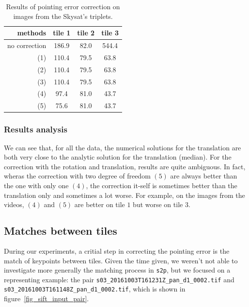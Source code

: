 \documentclass[paper=a4, fontsize=11pt, onecolumn, tikz, dvipsnames, svgnames, x11names]{article}
\begin{document}
        \begin{table}[h]
\centering
             \begin{tabular}{|r||c|c|c|}
              \hline
          methods &    tile 1 & tile 2 & tile 3 \\
              \hline
         no correction &    186.9& 82.0& 544.4 \\
             \hline
      (1) & 110.4& 79.5& 63.8\\
       (2) & 110.4& 79.5& 63.8\\
      (3) &  110.4& 79.5& 63.8\\
      (4) &  97.4& 81.0& 43.7\\
      (5) &  75.6& 81.0& 43.7\\
              \hline
            \end{tabular}
                            \caption{Results of pointing error correction on images from the Skysat's triplets.}
             \label{tab:triplet-res}
          \end{table}

     \subsubsection{Results analysis}

We can see that, for all the data, the numerical solutions for the translation are both very close to the analytic solution for the translation (median). For the correction with the rotation and translation, results are quite ambiguous. In fact, wheras the correction with two degree of freedom $(5)$ are always better than the one with only one $(4)$, the correction it-self is sometimes better than the translation only and sometimes a lot worse. For example, on the images from the videos, $(4)$ and $(5)$ are better on tile $1$ but worse on tile $3$.

\subsection{Matches between tiles}

During our experiments, a critial step in correcting the pointing error is the match of keypoints between tiles. Given the time given, we weren't not able to investigate more generally the matching process in \verb|s2p|, but we focused on a representing example: the pair \verb$s03_20161003T161231Z_pan_d1_0002.tif$ and \verb$s03_20161003T161148Z_pan_d1_0002.tif$, which is shown in figure~\ref{fig_sift_input_pair}.
\end{document}
